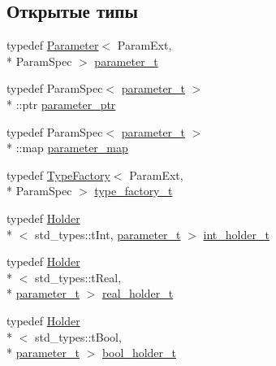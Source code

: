 \subsection*{Открытые типы}
\begin{DoxyCompactItemize}
\item 
typedef \hyperlink{classLIBKMS__namespace_1_1Parameter}{Parameter}$<$ Param\-Ext, \\*
Param\-Spec $>$ \hyperlink{structLIBKMS__namespace_1_1class__spec_a9dcd59cf4458e0bd59d72eaf15d0ed0e}{parameter\-\_\-t}
\item 
typedef Param\-Spec$<$ \hyperlink{structLIBKMS__namespace_1_1class__spec_a9dcd59cf4458e0bd59d72eaf15d0ed0e}{parameter\-\_\-t} $>$\\*
\-::ptr \hyperlink{structLIBKMS__namespace_1_1class__spec_aa835ddc774b27dd4d551341d64b4d945}{parameter\-\_\-ptr}
\item 
typedef Param\-Spec$<$ \hyperlink{structLIBKMS__namespace_1_1class__spec_a9dcd59cf4458e0bd59d72eaf15d0ed0e}{parameter\-\_\-t} $>$\\*
\-::map \hyperlink{structLIBKMS__namespace_1_1class__spec_a084ce0bd5bd9ead6059b0e35d04a4785}{parameter\-\_\-map}
\item 
typedef \hyperlink{classLIBKMS__namespace_1_1TypeFactory}{Type\-Factory}$<$ Param\-Ext, \\*
Param\-Spec $>$ \hyperlink{structLIBKMS__namespace_1_1class__spec_a2abf5149a27867873b0c0463c3bb376b}{type\-\_\-factory\-\_\-t}
\item 
typedef \hyperlink{classLIBKMS__namespace_1_1Holder}{Holder}\\*
$<$ std\-\_\-types\-::t\-Int, \hyperlink{structLIBKMS__namespace_1_1class__spec_a9dcd59cf4458e0bd59d72eaf15d0ed0e}{parameter\-\_\-t} $>$ \hyperlink{structLIBKMS__namespace_1_1class__spec_aacb3e2eca31377beaf0470dbdd2a8be7}{int\-\_\-holder\-\_\-t}
\item 
typedef \hyperlink{classLIBKMS__namespace_1_1Holder}{Holder}\\*
$<$ std\-\_\-types\-::t\-Real, \\*
\hyperlink{structLIBKMS__namespace_1_1class__spec_a9dcd59cf4458e0bd59d72eaf15d0ed0e}{parameter\-\_\-t} $>$ \hyperlink{structLIBKMS__namespace_1_1class__spec_a324d4bf3c62975e268edcee0812ac738}{real\-\_\-holder\-\_\-t}
\item 
typedef \hyperlink{classLIBKMS__namespace_1_1Holder}{Holder}\\*
$<$ std\-\_\-types\-::t\-Bool, \\*
\hyperlink{structLIBKMS__namespace_1_1class__spec_a9dcd59cf4458e0bd59d72eaf15d0ed0e}{parameter\-\_\-t} $>$ \hyperlink{structLIBKMS__namespace_1_1class__spec_a11f37b67e2050edaa156b7af6c0d1db7}{bool\-\_\-holder\-\_\-t}

\end{DoxyCompactItemize}
